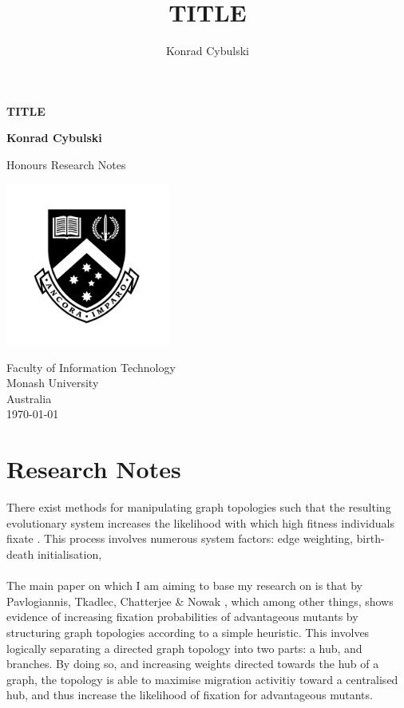 \documentclass[10pt,a4paper]{article}
\author{Konrad Cybulski}
\title{TITLE}
\begin{document}
	
\begin{titlepage}
	\begin{center}
		\vspace*{1cm}
		
		\LARGE
		\textbf{TITLE}
		
		\vspace{2cm}
		\Large
		
		\textbf{Konrad Cybulski}
		
		\vfill
		
		Honours Research Notes
		
		\vspace{0.8cm}
		
		\includegraphics[width=0.4\textwidth]{images/monash_emblem.jpg}
		
		\large
		Faculty of Information Technology\\
		Monash University\\
		Australia\\
		\today
		
	\end{center}
\end{titlepage}

\pagebreak
\tableofcontents
\pagebreak
\section{Research Notes}
There exist methods for manipulating graph topologies such that the resulting evolutionary system increases the likelihood with which high fitness individuals fixate \cite{graph amplifiersr, birth-death amplifiers}.
This process involves numerous system factors: edge weighting, birth-death initialisation, 
\\\\
The main paper on which I am aiming to base my research on is that by Pavlogiannis, Tkadlec, Chatterjee \& Nowak \cite{graph amplifiers}, which among other things, shows evidence of increasing fixation probabilities of advantageous mutants by structuring graph topologies according to a simple heuristic.
This involves logically separating a directed graph topology into two parts: a hub, and branches.
By doing so, and increasing weights directed towards the hub of a graph, the topology is able to maximise migration activitiy toward a centralised hub, and thus increase the likelihood of fixation for advantageous mutants.
\\\\
\end{document}
